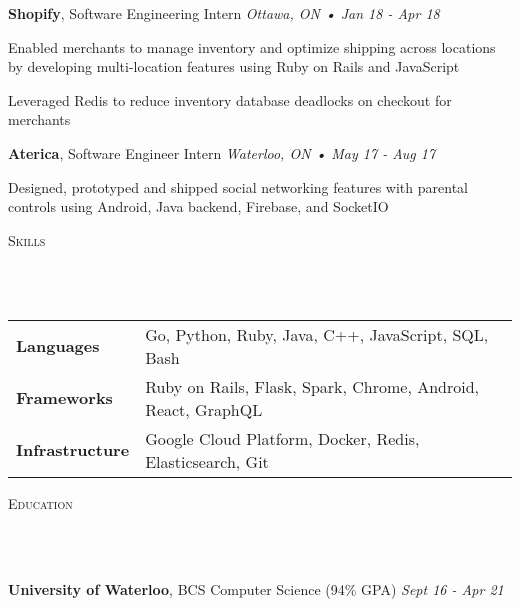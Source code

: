 \documentclass[a4paper, 12pt, hidelinks]{article}
\newcommand{\lineunder} {
    \vspace*{-8pt} \\
    \hrulefill \\
}
\newcommand{\header} [1] {
    \color{bigtext}
    {\hspace*{-4pt}\vspace*{6pt} \textsc{#1}}
    \vspace*{-6pt}
    \color{weaktext}
    \lineunder
    \vspace{6pt}
    \color{bodytext}
}
\newcommand{\jobheader} [3] {
    \color{bigtext}\textbf{#1}, {#2}
    \color{weaktext}\hfill{\small\textit{#3}}\\
    \vspace{-2mm} \color{bodytext}
}
\newcommand{\job} [5] {
    \jobheader{#1}{#2}{\small\textit{#3} • \textit{#4}}
    \begin{itemize}[leftmargin=1.8em, rightmargin=0.8em] \itemsep 1pt \color{bodytext}
        {#5}
    \end{itemize}
}
\begin{document}
\job{Shopify}{Software Engineering Intern}{Ottawa, ON}{Jan 18 - Apr 18}{
    \item Enabled merchants to manage inventory and optimize shipping across locations by developing
    multi-location features using Ruby on Rails and JavaScript
    \item Leveraged Redis to reduce inventory database deadlocks on checkout for merchants
}

\job{Aterica}{Software Engineer Intern}{Waterloo, ON}{May 17 - Aug 17}{
    \item Designed, prototyped and shipped social networking features with parental controls using Android,
    Java backend, Firebase, and SocketIO
}

\header{Skills}

\hspace{-10pt}
\begin{tabular}{ l l }
    \color{bigtext}\textbf{Languages}\color{bodytext} & Go, Python, Ruby, Java, C++, JavaScript, SQL, Bash \\[2pt]
    \color{bigtext}\textbf{Frameworks}\color{bodytext} & Ruby on Rails, Flask, Spark, Chrome, Android, React, GraphQL \\[2pt]
    \color{bigtext}\textbf{Infrastructure}\color{bodytext} & Google Cloud Platform, Docker, Redis, Elasticsearch, Git
\end{tabular}
\vspace{3mm}

\header{Education}
\jobheader{University of Waterloo}{BCS Computer Science (94\% GPA)}{Sept 16 - Apr 21}
\end{document}
